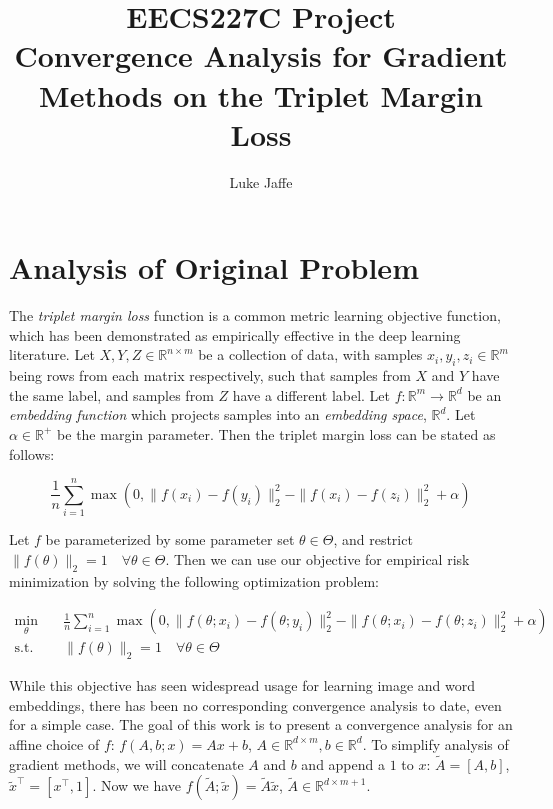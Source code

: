 \documentclass[11pt]{article}
\begin{document}
\author{Luke Jaffe}
\title{
    EECS227C Project \\
    \large Convergence Analysis for Gradient Methods on the Triplet Margin Loss
    }
\maketitle

\medskip

\section{Analysis of Original Problem}

The \textit{triplet margin loss} function is a common metric learning objective function, which has been demonstrated as empirically effective in the deep learning literature. Let $X, Y, Z \in \mathbb{R}^{n \times m}$ be a collection of data, with samples $x_i, y_i, z_i \in \mathbb{R}^m$ being rows from each matrix respectively, such that samples from $X$ and $Y$ have the same label, and samples from $Z$ have a different label. Let $f: \mathbb{R}^m \rightarrow \mathbb{R}^d$ be an \textit{embedding function} which projects samples into an \textit{embedding space}, $\mathbb{R}^d$. Let $\alpha \in \mathbb{R}^+$ be the margin parameter. Then the triplet margin loss can be stated as follows:

\begin{equation}
    \frac{1}{n} \sum_{i=1}^{n} \max(0, \| f(x_i) - f(y_i)\|_2^2 - \| f(x_i) - f(z_i)\|_2^2 + \alpha)
\end{equation}

Let $f$ be parameterized by some parameter set $\theta \in \Theta$, and restrict $\| f(\theta)\|_2 = 1 \quad \forall \theta \in \Theta$. Then we can use our objective for empirical risk minimization by solving the following optimization problem:

\begin{equation}
\begin{aligned}
    \min_{\theta} \quad & \frac{1}{n} \sum_{i=1}^{n} \max(0, \| f(\theta; x_i) - f(\theta; y_i)\|_2^2 - \| f(\theta; x_i) - f(\theta; z_i)\|_2^2 + \alpha) \\
    \textrm{s.t.} \quad &  \| f(\theta)\|_2 = 1 \quad \forall \theta \in \Theta
\end{aligned}
\end{equation}

While this objective has seen widespread usage for learning image and word embeddings, there has been no corresponding convergence analysis to date, even for a simple case. The goal of this work is to present a convergence analysis for an affine choice of $f$: $f(A, b; x) = Ax + b$, $A \in \mathbb{R}^{d \times m}, b \in \mathbb{R}^d$. To simplify analysis of gradient methods, we will concatenate $A$ and $b$ and append a $1$ to $x$: $\tilde{A} = [A, b]$, $\tilde{x}^\top = [x^\top, 1]$. Now we have $f(\tilde{A}; \tilde{x}) = \tilde{A} \tilde{x}$, $\tilde{A} \in \mathbb{R}^{d \times m+1}$.
\end{document}
